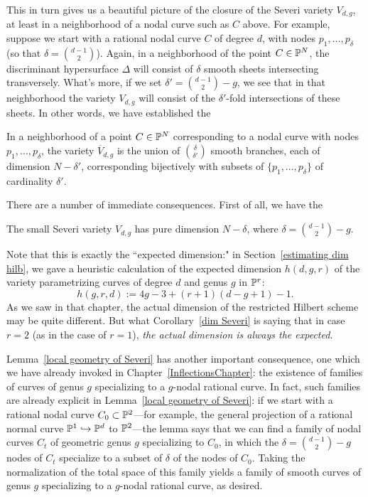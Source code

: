 This in turn gives us a beautiful picture of the closure of the Severi variety $V_{d,g}$, at least in a neighborhood of a nodal curve such as $C$ above. For example, suppose we start with a rational nodal curve $C$ of degree $d$, with nodes $p_1,\dots,p_\delta$ (so that $\delta = \binom{d-1}{2}$). Again, in a neighborhood of the point $C \in {\mathbb P}^N$, the discriminant hypersurface $\Delta$ will consist of $\delta$ smooth sheets intersecting transversely. What's more, if we set $\delta' = \binom{d-1}{2} - g$, we see that in that neighborhood the variety $V_{d,g}$ will consist of the $\delta'$-fold intersections of these sheets. In other words, we have established the

\begin{lemma}\label{local geometry of Severi}
In a neighborhood of a point $C \in {\mathbb P}^N$ corresponding to a nodal curve with nodes $p_1,\dots,p_\delta$,
the variety $\overline V_{d,g}$ is the union of $\binom{\delta}{\delta'}$ smooth branches, each of dimension $N - \delta'$, corresponding bijectively with subsets of $\{p_1,\dots,p_\delta\}$ of cardinality $\delta'$.
\end{lemma}

There are a number of immediate consequences. First of all, we have the

\begin{corollary}\label{dim Severi}
The small Severi variety $V_{d,g}$ has pure dimension $N - \delta$, where $\delta = \binom{d-1}{2} - g$.
\end{corollary}

Note that this is exactly the ``expected dimension:" in Section~\ref{estimating dim hilb}, we gave a heuristic calculation of the expected dimension $h(d,g,r)$ of the variety parametrizing curves of degree $d$ and genus $g$ in ${\mathbb P}^r$:
$$
h(g,r,d) := 4g-3 + (r+1)(d-g+1) - 1.
$$
As we saw in that chapter, the actual dimension of the restricted Hilbert scheme may be quite different. But what Corollary~\ref{dim Severi} is saying that in case $r=2$ (as in the case of $r=1$), \emph{the actual dimension is always the expected}.

Lemma~\ref{local geometry of Severi} has another important consequence, one which we have already invoked in Chapter~\ref{InflectionsChapter}: the existence of families of curves of genus $g$ specializing to a $g$-nodal rational curve. In fact, such families are already explicit in Lemma~\ref{local geometry of Severi}: if we start with a rational nodal  curve $C_0 \subset {\mathbb P}^2$---for example, the general projection of a rational normal curve ${\mathbb P}^1 \hookrightarrow {\mathbb P}^d$ to ${\mathbb P}^2$---the lemma says that we can find a family of nodal curves $C_t$ of geometric genus $g$ specializing to $C_0$, in which the  $\delta = \binom{d-1}{2} - g$ nodes of $C_t$ specialize to a subset of $\delta$ of the nodes of $C_0$. Taking the normalization of the total space of this family yields a family of smooth curves of genus $g$ specializing to a $g$-nodal rational curve, as desired.

